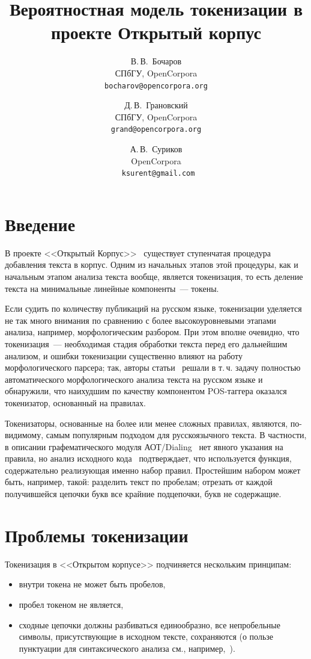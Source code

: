 \documentclass[a4paper]{article}
\begin{document}
\author{В.\,В.~Бочаров\\\small СПбГУ, OpenCorpora\\\small\tt bocharov@opencorpora.org\and Д.\,В.~Грановский\\\small СПбГУ, OpenCorpora\\\small\tt grand@opencorpora.org\and А.\,В.~Суриков\\\small OpenCorpora\\\small\tt\ ksurent@gmail.com}
\title{Вероятностная модель токенизации в проекте Открытый корпус}
\date{}
\maketitle
\section{Введение}
В проекте <<Открытый Корпус>>~\cite{opcorpora_dialog11}\cite{opcorpora_corpora11} существует ступенчатая процедура добавления текста в корпус. Одним из начальных этапов этой процедуры, как и начальным этапом анализа текста вообще, является токенизация, то есть деление текста на минимальные линейные компоненты~--- токены.

Если судить по количеству публикаций на русском языке, токенизации уделяется не так много внимания по сравнению с более высокоуровневыми этапами анализа, например, морфологическим разбором. При этом вполне очевидно, что токенизация~--- необходимая стадия обработки текста перед его дальнейшим анализом, и ошибки токенизации существенно влияют на работу морфологического парсера; так, авторы статьи~\cite{sharoff_dialog11} решали в т.\,ч. задачу полностью автоматического морфологического анализа текста на русском языке и обнаружили, что наихудшим по качеству компонентом POS-таггера оказался токенизатор, основанный на правилах.

Токенизаторы, основанные на более или менее сложных правилах, являются, по-видимому, самым популярным подходом для русскоязычного текста. В частности, в описании графематического модуля АОТ/Dialing~\cite{sokirko_disser} нет явного указания на правила, но анализ исходного кода~\cite{aot_code} подтверждает, что используется функция, содержательно реализующая именно набор правил. Простейшим набором может быть, например, такой: разделить текст по пробелам; отрезать от каждой получившейся цепочки букв все крайние подцепочки, букв не содержащие.
\section{Проблемы токенизации}
Токенизация в <<Открытом корпусе>> подчиняется нескольким принципам:
\begin{itemize}
\item внутри токена не может быть пробелов,
\item пробел токеном не является,
\item сходные цепочки должны разбиваться единообразно,
все непробельные символы, присутствующие в исходном тексте, сохраняются (о пользе пунктуации для синтаксического анализа см., например,~\cite{okatyev_dialog09}).
\end{itemize}
\end{document}
